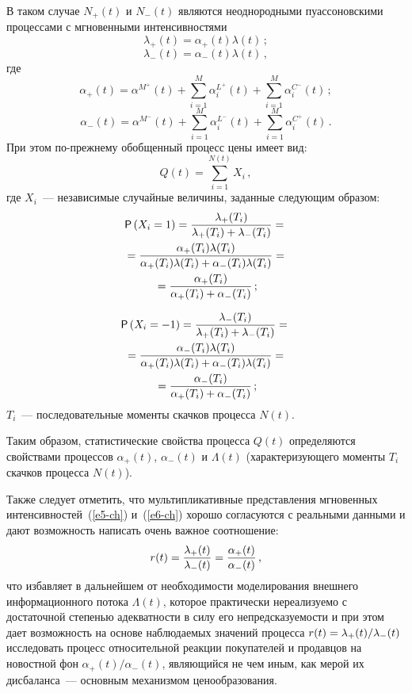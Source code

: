 \begin{multicols}{2}
В таком случае $N_+(t)$ и $N_-(t)$ являются неоднородными
пуассоновскими процессами с мгновенными интенсивностями
\begin{equation}
\lambda_+(t) = \alpha_+(t) \lambda(t)\,; \label{e5-ch}
\end{equation}
\begin{equation}
\lambda_-(t) = \alpha_-(t) \lambda(t)\,, \label{e6-ch}
\end{equation}
где
$$
\alpha_+(t) = \alpha^{M^+}(t) + \sum\limits_{i=1}^M \alpha_i^{L^+}(t) +
\sum\limits_{i=1}^M \alpha_i^{C^-}(t)\,;
$$
$$
\alpha_-(t) = \alpha^{M^-}(t) + \sum\limits_{i=1}^M \alpha_i^{L^-}(t) +
\sum\limits_{i=1}^M \alpha_i^{C^+}(t)\,.
$$
При этом по-прежнему обобщенный процесс цены имеет вид:
$$
Q(t) = \sum\limits_{i=1}^{N(t)} X_i\,,
$$
где $X_i$~--- независимые случайные величины, заданные следующим
образом:
\begin{multline}
{\sf P} \left( X_i = 1 \right) = \displaystyle\frac{\displaystyle \lambda_+(T_i)\mathstrut}{\displaystyle \lambda_+(T_i)
+ \lambda_-(T_i)\mathstrut} ={}\\
{}= \displaystyle\frac{\displaystyle \alpha_+(T_i) \lambda(T_i)\mathstrut}{\displaystyle \alpha_+(T_i)
\lambda(T_i) + \alpha_-(T_i) \lambda(T_i)\mathstrut} = {}\\
{}=\displaystyle\frac{\displaystyle \alpha_+(T_i)
\mathstrut}{\displaystyle \alpha_+(T_i) + \alpha_-(T_i)\mathstrut}\,; \label{e7-ch}
\end{multline}

\vspace*{-12pt}

\noindent
\begin{multline}
{\sf P} \left( X_i = -1 \right) = \displaystyle\frac{\displaystyle \lambda_-(T_i)\mathstrut}{\displaystyle \lambda_+(T_i)
+ \lambda_-(T_i)\mathstrut} = {}\\
{}=\displaystyle\frac{\displaystyle \alpha_-(T_i) \lambda(T_i)\mathstrut}{\displaystyle \alpha_+(T_i)
\lambda(T_i) + \alpha_-(T_i) \lambda(T_i)\mathstrut} ={}\\
{}= \displaystyle\frac{\displaystyle \alpha_-(T_i)
\mathstrut}{\displaystyle \alpha_+(T_i) + \alpha_-(T_i)\mathstrut}\,; \label{e8-ch}
\end{multline}
$T_i$~--- последовательные моменты скачков процесса $N(t)$.

Таким образом, статистические свойства процесса $Q(t)$ определяются
свойствами процессов $\alpha_+(t)$, $\alpha_-(t)$ и $\Lambda(t)$
(характеризующего моменты $T_i$ скачков процесса $N(t)$).

Также следует отметить, что мультипликативные представления
мгновенных интенсивностей~(\ref{e5-ch}) и~(\ref{e6-ch}) хорошо согласуются с реальными
данными и дают возможность написать очень важное соотношение:
$$
r(t) = \displaystyle\frac{\displaystyle \lambda_+(t)\mathstrut}{\displaystyle \lambda_-(t)\mathstrut} = \displaystyle\frac{\displaystyle \alpha_+(t)\mathstrut}{\displaystyle \alpha_-(t)\mathstrut}\,,
$$
что избавляет в дальнейшем от необходимости моделирования внешнего
информационного потока $\Lambda(t)$, которое практически
нереализуемо с до\-ста\-точ\-ной степенью адекватности в силу его
непред\-ска\-зу\-емости и при этом дает возможность на основе наблюдаемых
значений процесса $r(t)\hm=\lambda_+(t)/\lambda_-(t)$ исследовать
процесс относительной реакции покупателей и продавцов на новостной
фон $\alpha_+(t)/\alpha_-(t)$, являющийся не чем иным, как мерой их
дисбаланса~--- основным механизмом ценообразования.


\end{multicols}
